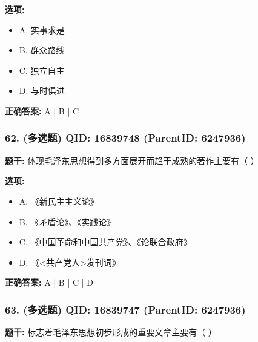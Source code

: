 \documentclass[12pt,UTF8]{ctexart}
\begin{document}
\textbf{选项:}
\begin{itemize}[leftmargin=*]

  \item A. 实事求是

  \item B. 群众路线

  \item C. 独立自主

  \item D. 与时俱进

\end{itemize}

\textbf{正确答案:}
A | B | C

\vspace{0.3em}\hrulefill\vspace{0.7em}

\subsubsection*{62. (多选题) \small QID: 16839748 (ParentID: 6247936)}

\textbf{题干:}
体现毛泽东思想得到多方面展开而趋于成熟的著作主要有（ ）



\textbf{选项:}
\begin{itemize}[leftmargin=*]

  \item A. 《新民主主义论》

  \item B. 《矛盾论》、《实践论》

  \item C. 《中国革命和中国共产党》、《论联合政府》

  \item D. 《<共产党人>发刊词》

\end{itemize}

\textbf{正确答案:}
A | B | C | D

\vspace{0.3em}\hrulefill\vspace{0.7em}

\subsubsection*{63. (多选题) \small QID: 16839747 (ParentID: 6247936)}

\textbf{题干:}
标志着毛泽东思想初步形成的重要文章主要有（ ）
\end{document}
